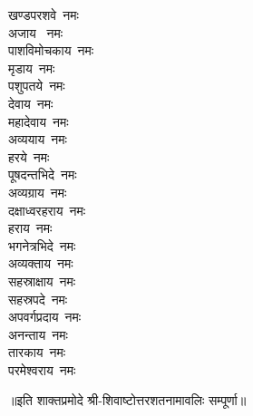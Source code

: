 \begin{multicols}{\maxColumns}
\begin{flushleft}
खण्डपरशवे~नमः\\
अजाय ~नमः\\
पाशविमोचकाय~नमः\hfill{}\\
मृडाय~नमः\\
पशुपतये~नमः\\
देवाय~नमः\\
महादेवाय~नमः\\
अव्ययाय~नमः\\
हरये~नमः\\
पूषदन्तभिदे~नमः\\
अव्यग्राय~नमः\\
दक्षाध्वरहराय~नमः\\
हराय~नमः\hfill{}\\
भगनेत्रभिदे~नमः\\
अव्यक्ताय~नमः\\
सहस्राक्षाय~नमः\\
सहस्रपदे~नमः\\
अपवर्गप्रदाय~नमः\\
अनन्ताय~नमः\\
तारकाय~नमः\\
परमेश्वराय~नमः\\
\end{flushleft}
\end{multicols}
॥इति शाक्तप्रमोदे श्री-शिवाष्टोत्तरशतनामावलिः सम्पूर्णा॥
